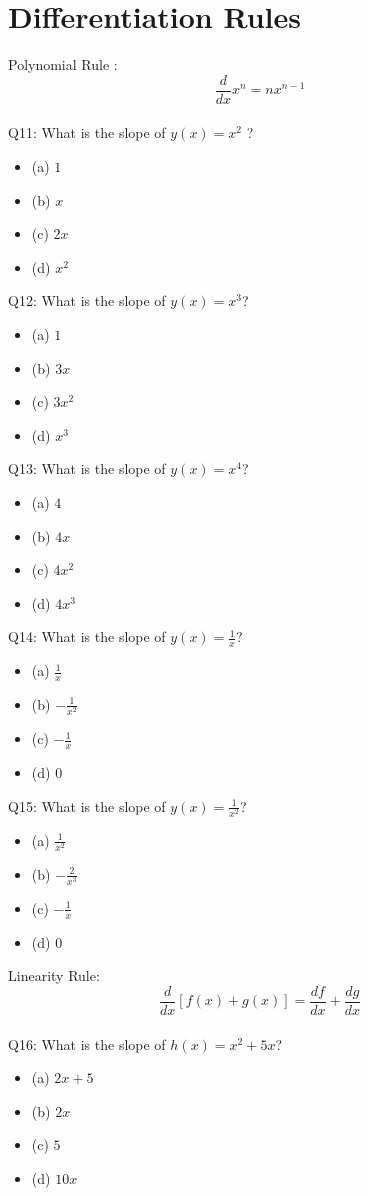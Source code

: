 \documentclass{article}
\begin{document}
\section{Differentiation Rules}
Polynomial Rule : $$\frac{d}{d x} x^n=n x^{n-1}$$\\[20pt]
Q11: What is the slope of $y(x)=x^2$ ?
\begin{itemize}
\item[] (a) $1$
\item[] (b) $x$
\item[] (c) $2 x$
\item[] (d) $x^2$
\end{itemize}
Q12: What is the slope of $y(x)=x^3 $?
\begin{itemize}
\item[] (a) $1$
\item[] (b) $3 x$
\item[] (c) $3 x^2$
\item[] (d) $x^3$
\end{itemize}
Q13: What is the slope of $y(x)=x^4 $?
\begin{itemize}
\item[] (a) $4$
\item[] (b) $4 x$
\item[] (c) $4 x^2$
\item[] (d) $4 x^3$
\end{itemize}
Q14: What is the slope of $y(x)=\frac{1}{x} $?
\begin{itemize}
\item[] (a) $\frac{1}{x}$
\item[] (b) $-\frac{1}{x^2}$
\item[] (c) $-\frac{1}{x}$
\item[] (d) $0$
\end{itemize}
Q15: What is the slope of $y(x)=\frac{1}{x^2} $?
\begin{itemize}
\item[](a) $\frac{1}{x^2}$
\item[](b) $-\frac{2}{x^3}$
\item[](c) $-\frac{1}{x}$
\item[](d) $0$
\end{itemize}
Linearity Rule: 
$$\frac{d}{d x}[f(x)+g(x)]=\frac{d f}{d x}+\frac{d g}{d x}$$\\[10pt]
Q16: What is the slope of $h(x)=x^2+5 x $?
\begin{itemize}
\item[] (a) $2 x+5$
\item[] (b) $2 x$
\item[] (c) $5$
\item[] (d) $10 x$
\end{itemize}
\end{document}
